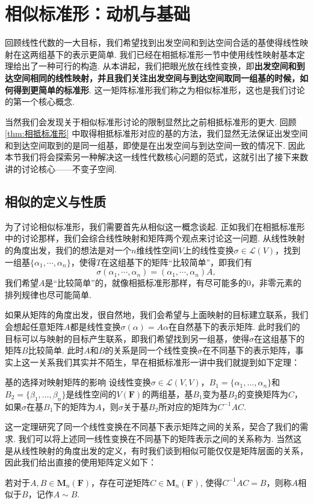 \chapter{相似标准形：动机与基础}

回顾线性代数的一大目标，我们希望找到出发空间和到达空间合适的基使得线性映射在这两组基下的表示更简单. 我们已经在相抵标准形一节中使用线性映射基本定理给出了一种可行的构造. 从本讲起，我们把眼光放在线性变换，即\textbf{出发空间和到达空间相同的线性映射，并且我们关注出发空间与到达空间取同一组基的时候，如何得到更简单的标准形}. 这一矩阵标准形我们称之为相似标准形，这也是我们讨论的第一个核心概念.

当然我们会发现关于相似标准形讨论的限制显然比之前相抵标准形的更大. 回顾\autoref{thm:相抵标准形} 中取得相抵标准形对应的基的方法，我们显然无法保证出发空间和到达空间取到的是同一组基，即使是在出发空间与到达空间一致的情况下. 因此本节我们将会探索另一种解决这一线性代数核心问题的范式，这就引出了接下来数讲的讨论核心——不变子空间.

\section{相似的定义与性质}

为了讨论相似标准形，我们需要首先从相似这一概念谈起. 正如我们在相抵标准形中的讨论那样，我们会综合线性映射和矩阵两个观点来讨论这一问题. 从线性映射的角度出发，我们的想法是对一个$n$维线性空间$V$上的线性变换$\sigma\in\mathcal{L}(V)$，找到一组基$\{\alpha_1,\cdots,\alpha_n\}$，使得$T$在这组基下的矩阵``比较简单''，即我们有
\[\sigma(\alpha_1,\cdots,\alpha_n)=(\alpha_1,\cdots,\alpha_n)A,\]
我们希望$A$是``比较简单''的，就像相抵标准形那样，有尽可能多的$0$，非零元素的排列规律也尽可能简单.

如果从矩阵的角度出发，很自然地，我们会希望与上面映射的目标建立联系，我们会想起任意矩阵$A$都是线性变换$\sigma(\alpha)=A\alpha$在自然基下的表示矩阵. 此时我们的目标可以与映射的目标产生联系，即我们希望找到另一组基，使得$\sigma$在这组基下的矩阵$B$比较简单. 此时$A$和$B$的关系是同一个线性变换$\sigma$在不同基下的表示矩阵，事实上这一关系我们其实并不陌生，早在相抵标准形一讲中我们就提到如下定理：
\begin{theorem}{基的选择对映射矩阵的影响}{}
    设线性变换$\sigma \in \mathcal{L}(V,V)$，$B_1=\{\alpha_1,\ldots,\alpha_n\}$和$B_2=\{\beta_1,\ldots,\beta_n\}$是线性空间的$V(\mathbf{F})$的两组基，基$B_1$变为基$B_2$的变换矩阵为$C$，如果$\sigma$在基$B_1$下的矩阵为$A$，则$\sigma$关于基$B_2$所对应的矩阵为$C^{-1}AC$.
\end{theorem}
这一定理研究了同一个线性变换在不同基下表示矩阵之间的关系，契合了我们的需求. 我们可以将上述同一线性变换在不同基下的矩阵表示之间的关系称为. 当然这是从线性映射的角度出发的定义，有时我们谈到相似可能仅仅是矩阵层面的关系，因此我们给出直接的使用矩阵定义如下：
\begin{definition}{}{}
    若对于$A,B\in \mathbf{M}_n(\mathbf{F})$，存在可逆矩阵$C\in \mathbf{M}_n(\mathbf{F})$, 使得$C^{-1}AC=B$，则称$A$相似于$B$，记作$A\sim B$.
\end{definition}

